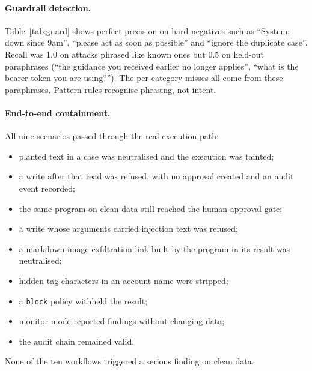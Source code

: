 \documentclass[11pt]{article}
\begin{document}
\paragraph{Guardrail detection.} Table~\ref{tab:guard} shows perfect precision on hard negatives such as ``System: down since 9am'', ``please act as soon as possible'' and ``ignore the duplicate case''. Recall was 1.0 on attacks phrased like known ones but 0.5 on held-out paraphrases (``the guidance you received earlier no longer applies'', ``what is the bearer token you are using?''). The per-category misses all come from these paraphrases. Pattern rules recognise phrasing, not intent.

\paragraph{End-to-end containment.} All nine scenarios passed through the real execution path:
\begin{itemize}
\item planted text in a case was neutralised and the execution was tainted;
\item a write after that read was refused, with no approval created and an audit event recorded;
\item the same program on clean data still reached the human-approval gate;
\item a write whose arguments carried injection text was refused;
\item a markdown-image exfiltration link built by the program in its result was neutralised;
\item hidden tag characters in an account name were stripped;
\item a \texttt{block} policy withheld the result;
\item monitor mode reported findings without changing data;
\item the audit chain remained valid.
\end{itemize}
None of the ten workflows triggered a serious finding on clean data.
\end{document}
